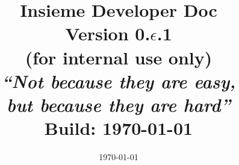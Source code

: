 \documentclass[11pt]{scrreprt}
\title{Insieme Developer Doc \\ Version 0.$\epsilon$.1 \\ (for internal use
only)\\
\vspace{2cm}
\textit{``Not because they are easy, \\ but because they are hard''}\\
\vspace{2cm}\Large{Build: \today}}
\date{\today}
\date{}
\begin{document}
 
\maketitle
\small
\tableofcontents
\newpage

\normalsize
\onehalfspacing









\printindex




%
%

\end{document}
